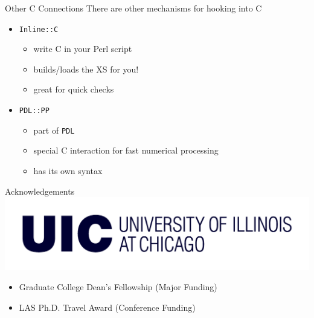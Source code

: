 \documentclass{beamer}
\providecommand{\code}[1]{{\texttt{\scriptsize{#1}}}}
\begin{document}
\begin{frame}{Other C Connections}
  There are other mechanisms for hooking into C
  \begin{itemize}
    \item \code{Inline::C}
      \begin{itemize}
        \item write C in your Perl script
        \item builds/loads the XS for you!
        \item great for quick checks
      \end{itemize}
    \item \code{PDL::PP}
      \begin{itemize}
        \item part of \code{PDL}
        \item special C interaction for fast numerical processing
        \item has its own syntax
      \end{itemize}
  \end{itemize}
\end{frame}

\begin{frame}{Acknowledgements}
  \includegraphics[width=0.7\linewidth]{uic}
  \begin{itemize}
    \item Graduate College Dean's Fellowship (Major Funding)
    \item LAS Ph.D. Travel Award (Conference Funding)
  \end{itemize}
\end{frame}
\end{document}
